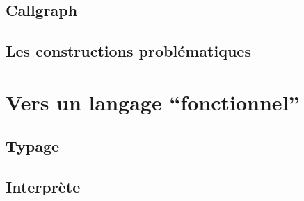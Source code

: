 \subsection{Callgraph}

\begin{frame}
  \frametitle{}
  \begin{block}{}
  \end{block}
\end{frame}

\subsection{Les constructions problématiques}

\begin{frame}
  \frametitle{}
  \begin{block}{}
  \end{block}
\end{frame}

\section{Vers un langage ``fonctionnel''}

\subsection{Typage}

\begin{frame}
  \frametitle{}
  \begin{block}{}
  \end{block}
\end{frame}

\subsection{Interprète}

\begin{frame}
  \frametitle{}
  \begin{block}{}
  \end{block}
\end{frame}
